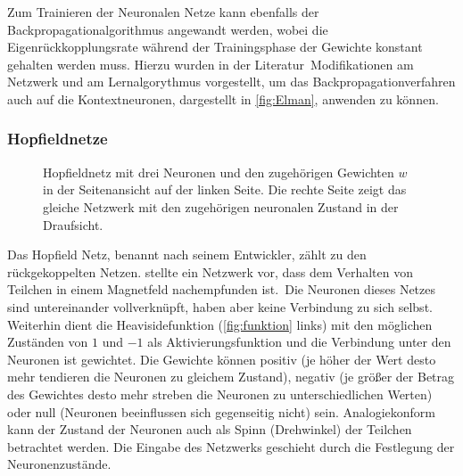 Zum Trainieren der Neuronalen Netze kann ebenfalls der Backpropagationalgorithmus angewandt werden, wobei die Eigenrückkopplungsrate während der Trainingsphase der Gewichte konstant gehalten werden muss. Hierzu wurden in der Literatur\, Modifikationen am Netzwerk und am Lernalgorythmus vorgestellt, um das Backpropagationverfahren auch auf die Kontextneuronen, dargestellt in \autoref{fig:Elman}, anwenden zu können.


\subsubsection{Hopfieldnetze}%
\begin{figure}[!htb]
    \centering
        
    \caption{Hopfieldnetz mit drei Neuronen und den zugehörigen Gewichten $w$ in der Seitenansicht auf der linken Seite. Die rechte Seite zeigt das gleiche Netzwerk mit den zugehörigen neuronalen Zustand in der Draufsicht.\,\protect\footnotemark{}}
    \label{fig:Hopfield}
\end{figure}
\addtocounter{footnote}{-1}     %
\addtocounter{Hfootnote}{-1}    %
\wrapfigfoot{}
Das Hopfield Netz, benannt nach seinem Entwickler, zählt zu den rückgekoppelten Netzen. \citet{HOPFIELD1986} stellte ein Netzwerk vor, dass dem Verhalten von Teilchen in einem Magnetfeld nachempfunden ist.\, Die Neuronen dieses Netzes sind untereinander vollverknüpft, haben aber keine Verbindung zu sich selbst. Weiterhin dient die Heavisidefunktion (\autoref{fig:funktion} links) mit den möglichen Zuständen von $1$ und $-1$ als Aktivierungsfunktion und die Verbindung unter den Neuronen ist gewichtet. Die Gewichte können positiv (je höher der Wert desto mehr tendieren die Neuronen zu gleichem Zustand), negativ (je größer der Betrag des Gewichtes desto mehr streben die Neuronen zu unterschiedlichen Werten) oder null (Neuronen beeinflussen sich gegenseitig nicht) sein. Analogiekonform kann der Zustand der Neuronen auch als Spinn (Drehwinkel) der Teilchen betrachtet werden. Die Eingabe des Netzwerks geschieht durch die Festlegung der Neuronenzustände. 

